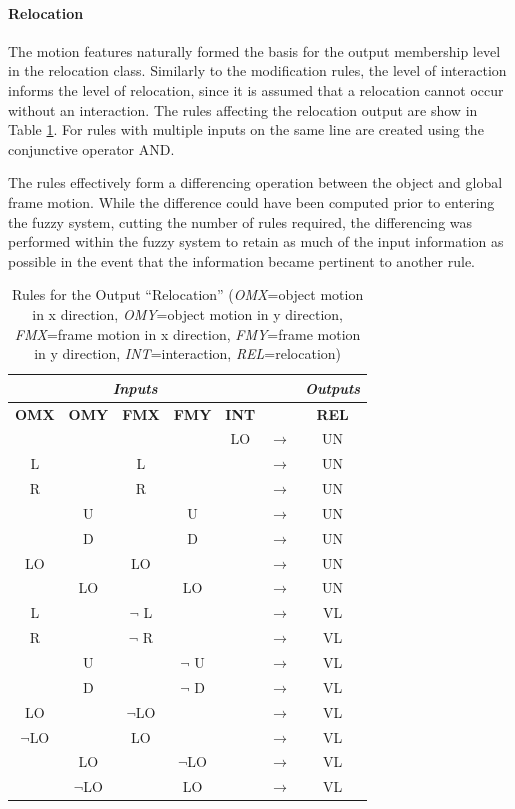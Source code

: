 \documentclass[12pt]{report}
\begin{document}
\paragraph{Relocation}
The motion features naturally formed the basis for the output membership level in the relocation class. Similarly to the modification rules, the level of interaction informs the level of relocation, since it is assumed that a relocation cannot occur without an interaction. The rules affecting the relocation output are show in Table \ref{relocateRules}. For rules with multiple inputs on the same line are created using the conjunctive operator AND.

The rules effectively form a differencing operation between the object and global frame motion. While the difference could have been computed prior to entering the fuzzy system, cutting the number of rules required, the differencing was performed within the fuzzy system to retain as much of the input information as possible in the event that the information became pertinent to another rule.

\begin{table}
\caption{Rules for the Output ``Relocation'' (\textit{OMX}=object motion in x direction, \textit{OMY}=object motion in y direction, \textit{FMX}=frame motion in x direction, \textit{FMY}=frame motion in y direction, \textit{INT}=interaction, \textit{REL}=relocation)}
\begin{center}
\begin{tabular}{ccccccc}
\hline
\multicolumn{5}{c}{\textbf{\textit{Inputs}}} & & \textbf{\textit{Outputs}} \\
\hline
\hline
\textbf{OMX} & \textbf{OMY} & \textbf{FMX} & \textbf{FMY} & \textbf{INT} & & \textbf{REL}\\
\hline
 & & & & LO & $\longrightarrow$ & UN \\
L & & L & & & $\longrightarrow$ & UN \\
R & & R & & & $\longrightarrow$ &  UN \\
& U & & U & &$\longrightarrow$ &  UN \\
& D & & D & &$\longrightarrow$ &  UN \\
LO & & LO & & & $\longrightarrow$ & UN \\
 & LO & & LO & & $\longrightarrow$ & UN \\

 L & & $\neg$ L & & & $\longrightarrow$ & VL \\
 R & & $\neg$ R & & & $\longrightarrow$ & VL \\
 & U & & $\neg$ U & & $\longrightarrow$ & VL \\
 & D & & $\neg$ D & & $\longrightarrow$ & VL \\
 LO & & $\neg$LO & & & $\longrightarrow$ & VL \\
 $\neg$LO & & LO & & & $\longrightarrow$ & VL \\
 & LO & & $\neg$LO & & $\longrightarrow$ & VL \\
 & $\neg$LO & & LO & & $\longrightarrow$ & VL \\
\hline
\end{tabular}
\label{relocateRules}
\end{center}
\end{table}
\end{document}
